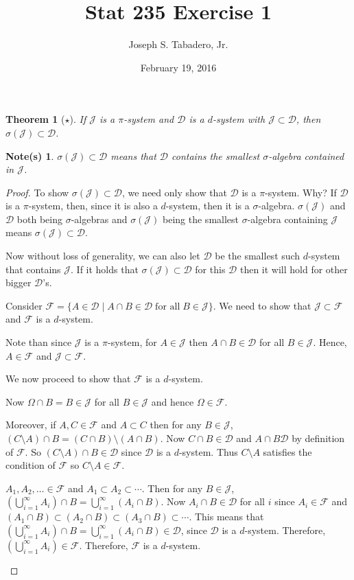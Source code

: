 \documentclass{article}
\title{Stat 235 Exercise 1}
\author{Joseph S. Tabadero, Jr.}
\date{February 19, 2016}
\newtheorem*{theorem*}{Theorem}
\newtheorem{notes}{Note(s)}
\newcommand{\D}{\ensuremath{\mathcal D}}
\newcommand{\F}{\ensuremath{\mathcal F}}
\newcommand{\J}{\ensuremath{\mathcal J}}
\begin{document}
	
	\maketitle

\begin{theorem*}[$\star$]\label{thm:3}
If $\mathcal J$ is a $\pi$-system and $\mathcal D$ is a $d$-system with $\mathcal J\subset \mathcal D$, then $\sigma(\mathcal J)\subset \mathcal D$.
\end{theorem*}

\begin{notes}
$\sigma(\mathcal J)\subset \mathcal D$ means that $\D$ contains the smallest $\sigma$-algebra contained in $\J$. 
\end{notes}

\begin{proof}
To show $\sigma(\J)\subset \D$, we need only show that $\D$ is a $\pi$-system. Why? If $\D$ is a $\pi$-system, then, since it is also a $d$-system, then it is a $\sigma$-algebra. $\sigma(\J)$ and $\D$ both being $\sigma$-algebras and $\sigma(\J)$ being the smallest $\sigma$-algebra containing $\J$ means $\sigma(\J)\subset \D$.

Now without loss of generality, we can also let $\D$ be the smallest such $d$-system that contains $\J$. If it holds that $\sigma(\J)\subset \D$ for this $\D$ then it will hold for other bigger $\D$'s.

Consider $\F=\{A\in\D\mid A\cap B\in\D\; \text{for all}\; B\in\J \}$. We need to show that $\J\subset \F$ and $\F$ is a $d$-system.

Note than since $\J$ is a $\pi$-system, for $A\in\J$ then $A\cap B\in \D$ for all $B\in\J$. Hence, $A\in\F$ and $\J\subset\F$.


We now proceed to show that $\F$ is a $d$-system. 
\begin{prooflist}
	\item Now $\Omega\cap B=B\in\J$ for all $B\in\J$ and hence $\Omega\in\F$.
	\item Moreover, if $A,C\in\F$ and $A\subset C$ then for any $B\in \J$, $(C\setminus A)\cap B=(C\cap B)\setminus (A\cap B)$. Now $C\cap B\in \D$ and $A\cap B \D$ by definition of $\F$. So $(C\setminus A)\cap B\in \D$ since $\D$ is a $d$-system. Thus $C\setminus A$ satisfies the condition of $\F$ so $C\setminus A\in \F$.
	\item $A_1, A_2, \ldots \in\F$ and $A_1\subset A_2\subset\cdots$. Then for any $B\in\J$, $\left(\bigcup_{i=1}^\infty A_i\right)\cap B = \bigcup_{i=1}^\infty(A_i\cap B)$. Now $A_i\cap B\in\D$ for all $i$ since $A_i\in\F$ and $(A_1\cap B)\subset (A_2\cap B)\subset (A_3\cap B)\subset \cdots$. This means that $\left(\bigcup_{i=1}^\infty A_i\right)\cap B=\bigcup_{i=1}^\infty(A_i\cap B)\in\D$, since $\D$ is a $d$-system. Therefore, $\left(\bigcup_{i=1}^\infty A_i\right)\in\F$. Therefore, $\F$ is a $d$-system.
\end{prooflist}




\end{proof}
\end{document}
